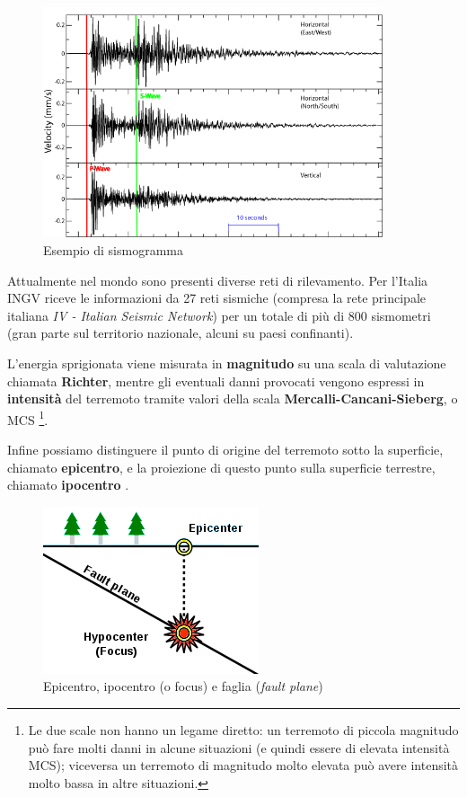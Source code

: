 \documentclass[a4paper,10pt]{memoir}
\begin{document}
\begin{figure}[ht]
\caption{Esempio di sismogramma}
\label{fig:sismogramma}
\centering
\includegraphics[width=10cm]{introduzione/seismogram}
\end{figure}

Attualmente nel mondo sono presenti diverse reti di rilevamento. Per l'Italia INGV riceve le informazioni da 27 reti sismiche (compresa la rete principale italiana \textit{IV - Italian Seismic Network}) per un totale di più di 800 sismometri (gran parte sul territorio nazionale, alcuni su paesi confinanti).

L'energia sprigionata viene misurata in \textbf{magnitudo} su una scala di valutazione chiamata \textbf{Richter}, mentre gli eventuali danni provocati vengono espressi in \textbf{intensità} del terremoto tramite valori della scala \textbf{Mercalli-Cancani-Sieberg}, o MCS \footnote{Le due scale non hanno un legame diretto: un terremoto di piccola magnitudo può fare molti danni in alcune situazioni (e quindi essere di elevata intensità MCS); viceversa un terremoto di magnitudo molto elevata può avere intensità molto bassa in altre situazioni.}.

Infine possiamo distinguere il punto di origine del terremoto sotto la superficie, chiamato \textbf{epicentro}, e la proiezione di questo punto sulla superficie terrestre, chiamato \textbf{ipocentro} \cite{introdseismo}.

\begin{figure}[ht]
\caption{Epicentro, ipocentro (o focus) e faglia (\textit{fault plane})}
\label{fig:epiipo}
\centering
\includegraphics[scale=0.6]{introduzione/epicenter_diagram}
\end{figure}
\end{document}
